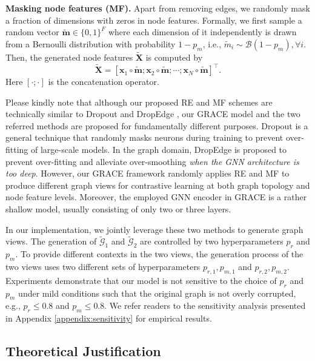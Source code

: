 \documentclass{article}
\theoremstyle{remark}
\begin{document}
\textbf{Masking node features (MF). \quad}
Apart from removing edges, we randomly mask a fraction of dimensions with zeros in node features. Formally, we first sample a random vector \(\widetilde{\bm{m}} \in \{ 0, 1 \}^F\) where each dimension of it independently is drawn from a Bernoulli distribution with probability \(1 - p_m\), i.e., \(\widetilde{m}_i \sim \mathcal{B}(1 - p_m), \forall i\). Then, the generated node features \(\widetilde {\bm X}\) is computed by
\begin{equation}
	\widetilde {\bm{X}} = [ \bm x_1 \circ \widetilde{\bm{m}}; \bm x_2 \circ \widetilde{\bm{m}}; \cdots; \bm{x}_N \circ \widetilde{\bm{m}} ]^\top.
\end{equation}
Here \([\cdot ; \cdot ]\) is the concatenation operator.

Please kindly note that although our proposed RE and MF schemes are technically similar to Dropout \cite{Srivastava:2014cg} and DropEdge \cite{Rong:2020vx}, our GRACE model and the two referred methods are proposed for fundamentally different purposes. Dropout is a general technique that randomly masks neurons during training to prevent over-fitting of large-scale models. In the graph domain, DropEdge is proposed to prevent over-fitting and alleviate over-smoothing \emph{when the GNN architecture is too deep}. However, our GRACE framework randomly applies RE and MF to produce different graph views for contrastive learning at both graph topology and node feature levels. Moreover, the employed GNN encoder in GRACE is a rather shallow model, usually consisting of only two or three layers.



In our implementation, we jointly leverage these two methods to generate graph views.
The generation of \(\widetilde{\mathcal G}_1\) and \(\widetilde{\mathcal G}_2\) are controlled by two hyperparameters \(p_r\) and \(p_m\). 
To provide different contexts in the two views, the generation process of the two views uses two different sets of hyperparameters \(p_{r,1}, p_{m,1}\) and \(p_{r,2}, p_{m,2}\).
Experiments demonstrate that our model is not sensitive to the choice of \(p_r\) and \(p_m\) under mild conditions such that the original graph is not overly corrupted, e.g., \(p_r \le 0.8\) and \(p_m \le 0.8\). We refer readers to the sensitivity analysis presented in Appendix \ref{appendix:sensitivity} for empirical results.

\subsection{Theoretical Justification}
\end{document}
